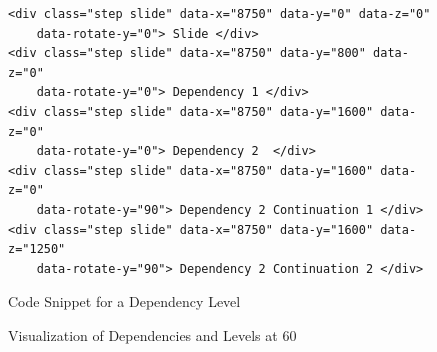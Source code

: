 \documentclass[twoside, 12pt]{article}
\begin{document}
\begin{figure}
\vspace{0pt}
\begin{verbatim}
<div class="step slide" data-x="8750" data-y="0" data-z="0"
	data-rotate-y="0"> Slide </div>
<div class="step slide" data-x="8750" data-y="800" data-z="0"
	data-rotate-y="0"> Dependency 1 </div>
<div class="step slide" data-x="8750" data-y="1600" data-z="0" 
	data-rotate-y="0"> Dependency 2  </div>
<div class="step slide" data-x="8750" data-y="1600" data-z="0" 
	data-rotate-y="90"> Dependency 2 Continuation 1 </div>
<div class="step slide" data-x="8750" data-y="1600" data-z="1250" 
	data-rotate-y="90"> Dependency 2 Continuation 2 </div>
\end{verbatim}
\vspace{-5pt}
  \caption{Code Snippet for a Dependency Level}
  \label{fig:dependencyLevelSnippet}
  \vspace{12pt}
\end{figure}

\begin{figure}
\vspace{-26pt}
  \begin{center}
\vspace{-5pt}
  \caption{Visualization of Dependencies and Levels at 60\degree}
  \label{fig:visualDependencyDegree}
\vspace{-24pt}
  \end{center}
\end{figure}
\end{document}
